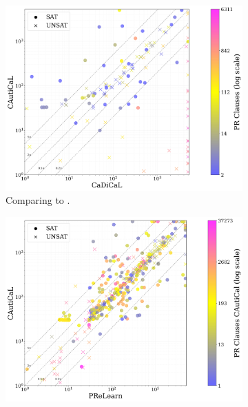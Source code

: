 \begin{figure}[!t]
    \centering
    \begin{subfigure}[t]{0.45\textwidth}
        \centering
        \includegraphics[width=\textwidth]{figs/cadical_vs_cautical_nontrivial.jpg}
        \caption{Comparing \tool to \cadical.}%
        \label{subfig:cautical-vs-cadical-satcomp}
    \end{subfigure}
    \hspace{0.06\textwidth}
    \begin{subfigure}[t]{0.45\textwidth}
        \centering
        \includegraphics[width=\textwidth]{figs/prelearn_vs_cautical_nontrivial.jpg}

\end{subfigure}
\end{figure}

